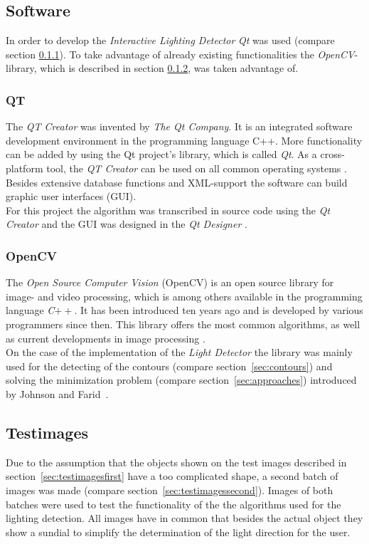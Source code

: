 \subsection{Software} \label{sec:Software}
In order to develop the \textit{Interactive Lighting Detector} \textit{Qt} was used (compare section \ref{sec:qt}). To take advantage of already existing functionalities the \textit{OpenCV}-library, which is described in section \ref{sec:opencv}, was taken advantage of.


\subsubsection{QT} \label{sec:qt}
The \textit{QT Creator} was invented by \textit{The Qt Company}. It is an integrated software development environment in the programming language C++. More functionality can be added by using the Qt project's library, which is called \textit{Qt}.
As a cross-platform tool, the \textit{QT Creator} can be used on all common operating systems \cite{QTCreator}. \\ Besides extensive database functions and XML-support the software can build graphic user interfaces (GUI).\\
For this project the algorithm was transcribed in source code using the \textit{Qt Creator} and the GUI was designed in the \textit{Qt Designer} \cite{website:QtDesigner}.




\subsubsection{OpenCV} \label{sec:opencv}
The \textit{Open Source Computer Vision} (OpenCV) is an open source library for image- and video processing, which is among others available in the programming language \textit{C}$++$. It has been introduced ten years ago and is developed by various programmers since then. This library offers the most common algorithms, as well as current developments in image processing \cite{article:OpenCV}.\\
On the case of the implementation of the \textit{Light Detector} the library was mainly used for the detecting of the contours (compare section~\ref{sec:contours}) and solving the minimization problem (compare section~\ref{sec:approaches}) introduced by Johnson and Farid~\cite{Johnson}.


\subsection{Testimages} \label{sec:testimages}
Due to the assumption that the objects shown on the test images described in section~\ref{sec:testimagesfirst} have a too complicated shape, a second batch of images was made (compare section~\ref{sec:testimagessecond}). Images of both batches were used to test the functionality of the the algorithms used for the lighting detection. All images have in common that besides the actual object they show a sundial to simplify the determination of the light direction for the user.


